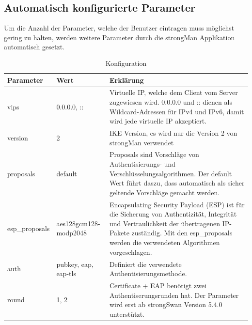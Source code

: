 \subsection{Automatisch konfigurierte Parameter}
Um die Anzahl der Parameter, welche der Benutzer eintragen muss möglichst gering zu halten, werden weitere Parameter durch die strongMan Applikation automatisch gesetzt. \\
\begin{table}[H]
\centering
    \begin{tabular}{|p{}|p{}|p{}|}
    \hline
    \rowcolor{lightblue}
    Parameter & Wert & Erklärung \\ \hline
	vips	&	0.0.0.0,  :: & Virtuelle IP, welche dem Client vom Server zugewiesen wird. 0.0.0.0 und :: dienen als Wildcard-Adressen für IPv4 und IPv6, damit wird jede virtuelle IP akzeptiert.	\\ \hline
	version & 2 & IKE Version, es wird nur die Version 2 von strongMan verwendet \\ \hline
	proposals & default & Proposals sind Vorschläge von Authentisierungs- und Verschlüsselungsalgorithmen. Der default Wert führt daszu, dass automatisch als sicher geltende Vorschläge gemacht werden.\\ \hline
	esp\_proposals & aes128gcm128-modp2048 & Encapsulating Security Payload (ESP) ist für die Sicherung von Authentizität, Integrität und Vertraulichkeit der übertragenen IP-Pakete zuständig. Mit den esp\_proposals werden die verwendeten Algorithmen vorgeschlagen. \\ \hline
	auth & pubkey, eap, eap-tls & Definiert die verwendete Authentisierungsmethode. \\ \hline
	round & 1, 2 & Certificate + EAP benötigt zwei Authentiserungsrunden hat. Der Parameter wird erst ab strongSwan Version 5.4.0 unterstützt. \\ \hline
	\end{tabular}
    \caption[Konfiguration]{Konfiguration}
\end{table}\medskip

